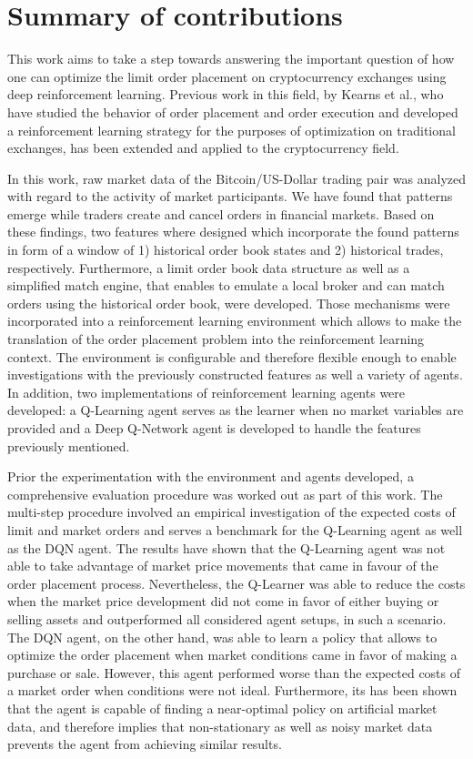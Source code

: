 \section{Summary of contributions}

This work aims to take a step towards answering the important question of how one can optimize the limit order placement on cryptocurrency exchanges using deep reinforcement learning.
Previous work in this field, by Kearns et al., who have studied the behavior of order placement and order execution\cite{nevmyvaka2005electronic} and developed a reinforcement learning strategy\cite{nevmyvaka2006reinforcement} for the purposes of optimization on traditional exchanges, has been extended and applied to the cryptocurrency field.

In this work, raw market data of the Bitcoin/US-Dollar trading pair was analyzed with regard to the activity of market participants.
We have found that patterns emerge while traders create and cancel orders in financial markets.
Based on these findings, two features where designed which incorporate the found patterns in form of a window of 1) historical order book states and 2) historical trades, respectively.
Furthermore, a limit order book data structure as well as a simplified match engine, that enables to emulate a local broker and can match orders using the historical order book, were developed.
Those mechanisms were incorporated into a reinforcement learning environment which allows to make the translation of the order placement problem into the reinforcement learning context.
The environment is configurable and therefore flexible enough to enable investigations with the previously constructed features as well a variety of agents.
In addition, two implementations of reinforcement learning agents were developed: a Q-Learning agent serves as the learner when no market variables are provided and a Deep Q-Network agent is developed to handle the features previously mentioned.

Prior the experimentation with the environment and agents developed, a comprehensive evaluation procedure was worked out as part of this work.
The multi-step procedure involved an empirical investigation of the expected costs of limit and market orders and serves a benchmark for the Q-Learning agent as well as the DQN agent.
The results have shown that the Q-Learning agent was not able to take advantage of market price movements that came in favour of the order placement process.
Nevertheless, the Q-Learner was able to reduce the costs when the market price development did not come in favor of either buying or selling assets and outperformed all considered agent setups, in such a scenario.
The DQN agent, on the other hand, was able to learn a policy that allows to optimize the order placement when market conditions came in favor of making a purchase or sale.
However, this agent performed worse than the expected costs of a market order when conditions were not ideal.
Furthermore, its has been shown that the agent is capable of finding a near-optimal policy on artificial market data, and therefore implies that non-stationary as well as noisy market data prevents the agent from achieving similar results.

